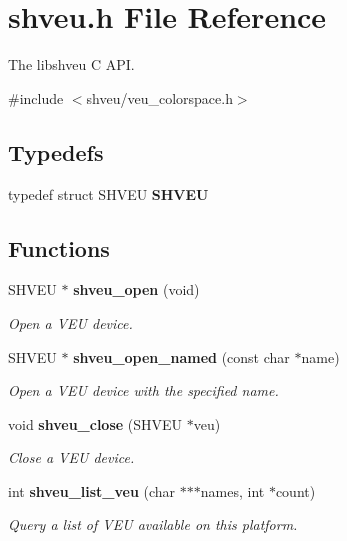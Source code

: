 \section{shveu.h File Reference}
\label{shveu_8h}


The libshveu C API.  


{\ttfamily \#include $<$shveu/veu\_\-colorspace.h$>$}\par
\subsection*{Typedefs}
\begin{DoxyCompactItemize}
\item 
typedef struct SHVEU {\bfseries SHVEU}\label{shveu_8h_a4654ca3b48cfd1af073f174dc3ae5b94}

\end{DoxyCompactItemize}
\subsection*{Functions}
\begin{DoxyCompactItemize}
\item 
SHVEU $\ast$ {\bf shveu\_\-open} (void)
\begin{DoxyCompactList}\small\item\em Open a VEU device. \item\end{DoxyCompactList}\item 
SHVEU $\ast$ {\bf shveu\_\-open\_\-named} (const char $\ast$name)
\begin{DoxyCompactList}\small\item\em Open a VEU device with the specified name. \item\end{DoxyCompactList}\item 
void {\bf shveu\_\-close} (SHVEU $\ast$veu)
\begin{DoxyCompactList}\small\item\em Close a VEU device. \item\end{DoxyCompactList}\item 
int {\bf shveu\_\-list\_\-veu} (char $\ast$$\ast$$\ast$names, int $\ast$count)
\begin{DoxyCompactList}\small\item\em Query a list of VEU available on this platform. \item\end{DoxyCompactList}\end{DoxyCompactItemize}


